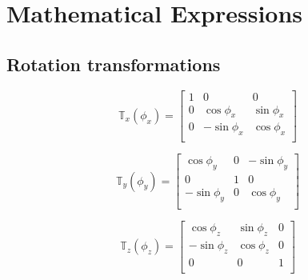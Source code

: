 \section{Mathematical Expressions\label{app:a}}


\subsection{Rotation transformations\label{appendix:rotational_transformations}}

\begin{equation}
    \mathbb{T}_x(\phi_x)=
    \begin{bmatrix}
        1 & 0           & 0          \\
        0 & \cos\phi_x  & \sin\phi_x \\
        0 & -\sin\phi_x & \cos\phi_x \\
    \end{bmatrix}
\end{equation}

\begin{equation}
    \mathbb{T}_y(\phi_y)=
    \begin{bmatrix}
        \cos\phi_y  & 0 & -\sin\phi_y \\
        0           & 1 & 0           \\
        -\sin\phi_y & 0 & \cos\phi_y  \\
    \end{bmatrix}
\end{equation}

\begin{equation}
    \mathbb{T}_z(\phi_z)=
    \begin{bmatrix}
        \cos\phi_z  & \sin\phi_z & 0 \\
        -\sin\phi_z & \cos\phi_z & 0 \\
        0           & 0          & 1 \\
    \end{bmatrix}
\end{equation}


